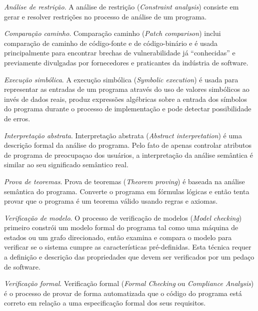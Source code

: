 \begin{description}
  \item \textit{Análise de restrição}.
    A análise de restrição ({\it Constraint analysis}) consiste em gerar
    e resolver restrições no processo de análise de um programa.

  \item \textit{Comparação caminho}.
    Comparação caminho ({\it Patch comparison}) inclui comparação de caminho de
    código-fonte e de código-binário e é usada principalmente para encontrar
    brechas de vulnerabilidade já ``conhecidas'' e previamente divulgadas por
    fornecedores e praticantes da indústria de software.

  \item \textit{Execução simbólica}.
    A execução simbólica ({\it Symbolic execution}) é usada para representar
    as entradas de um programa através do uso de valores simbólicos ao invés
    de dados reais, produz expressões algébricas sobre a entrada dos símbolos
    do programa durante o processo de implementação e pode detectar
    possibilidade de erros.

  \item \textit{Interpretação abstrata}.
    Interpretação abstrata ({\it Abstract interpretation}) é uma descrição
    formal da análise do programa. Pelo fato de apenas controlar atributos de
    programa de preocupaçao dos usuários, a interpretação da análise semântica
    é similar ao seu significado semântico real.

  \item \textit{Prova de teoremas}.
    Prova de teoremas ({\it Theorem proving}) é baseada na análise semântica do
    programa. Converte o programa em fórmulas lógicas e então tenta provar que
    o programa é um teorema válido usando regras e axiomas.

  \item \textit{Verificação de modelo}.
    O processo de verificação de modelos ({\it Model checking}) primeiro constrói
    um modelo formal do programa tal como uma máquina de estados ou um grafo
    direcionado, então examina e compara o modelo para verificar se o sistema
    cumpre as características pré-definidas. Esta técnica requer a definição e
    descrição das propriedades que devem ser verificados por um pedaço de
    software.

  \item \textit{Verificação formal}.
    Verificação formal ({\it Formal Checking} ou {\it Compliance Analysis}) é o
    processo de provar de forma automatizada que o código do programa está
    correto em relação a uma especificação formal dos seus requisitos.


\end{description}
